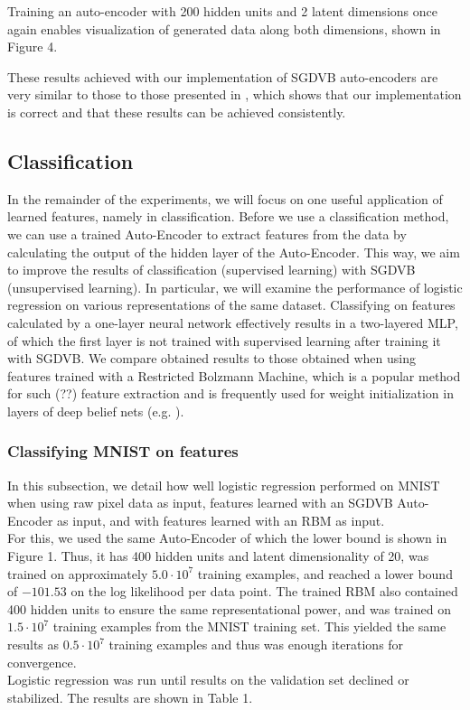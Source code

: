 \documentclass{article}
\begin{document}
Training an auto-encoder with 200 hidden units and 2 latent dimensions once again enables visualization of generated data along both dimensions, shown in Figure 4.

These results achieved with our implementation of SGDVB auto-encoders are very similar to those to those presented in \cite{kingma2013auto}, which shows that our implementation is correct and that these results can be achieved consistently. 

\subsection{Classification}

In the remainder of the experiments, we will focus on one useful application of learned features, namely in classification. Before we use a classification method, we can use a trained Auto-Encoder to extract features from the data by calculating the output of the hidden layer of the Auto-Encoder. This way, we aim to improve the results of classification (supervised learning) with SGDVB (unsupervised learning). In particular, we will examine the performance of logistic regression on various representations of the same dataset. Classifying on features calculated by a one-layer neural network effectively results in a two-layered MLP, of which the first layer is not trained with supervised learning after training it with SGDVB. We compare obtained results to those obtained when using features trained with a Restricted Bolzmann Machine, which is a popular method for such (??) feature extraction and is frequently used for weight initialization in layers of deep belief nets (e.g. \cite{bengio2007greedy} ).

\subsubsection{Classifying MNIST on features}

In this subsection, we detail how well logistic regression performed on MNIST when using raw pixel data as input, features learned with an SGDVB Auto-Encoder as input, and with features learned with an RBM as input. \\ For this, we used the same Auto-Encoder of which the lower bound is shown in Figure 1. Thus, it has 400 hidden units and latent dimensionality of 20, was trained on approximately $5.0\cdot 10^7$ training examples, and reached a lower bound of $-101.53$ on the log likelihood per data point. The trained RBM also contained 400 hidden units to ensure the same representational power, and was trained on $1.5\cdot 10^7$ training examples from the MNIST training set. This yielded the same results as $0.5\cdot 10^7$ training examples and thus was enough iterations for convergence.\\
Logistic regression was run until results on the validation set declined or stabilized. The results are shown in Table 1.
\end{document}
